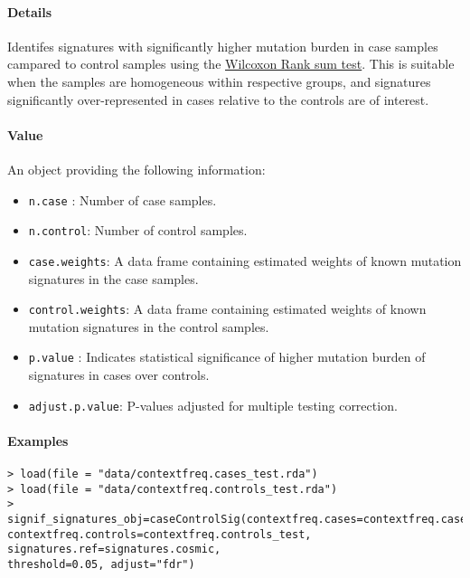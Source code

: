 \documentclass[]{article}
\providecommand{\tightlist}{%
  \setlength{\itemsep}{0pt}\setlength{\parskip}{0pt}}
\let\oldparagraph\paragraph
\renewcommand{\paragraph}[1]{\oldparagraph{#1}\mbox{}}
\begin{document}
\paragraph{\texorpdfstring{\textbf{Details}}{Details}}\label{details-9}

Identifes signatures with significantly higher mutation burden in case
samples campared to control samples using the
\href{https://www.rdocumentation.org/packages/stats/versions/3.5.2/topics/wilcox.test}{Wilcoxon
Rank sum test}. This is suitable when the samples are homogeneous within
respective groups, and signatures significantly over-represented in
cases relative to the controls are of interest.

\paragraph{\texorpdfstring{\textbf{Value}}{Value}}\label{value-11}

An object providing the following information:

\begin{itemize}
\tightlist
\item
  \texttt{n.case} : Number of case samples.
\item
  \texttt{n.control}: Number of control samples.
\item
  \texttt{case.weights}: A data frame containing estimated weights of
  known mutation signatures in the case samples.
\item
  \texttt{control.weights}: A data frame containing estimated weights of
  known mutation signatures in the control samples.
\item
  \texttt{p.value} : Indicates statistical significance of higher
  mutation burden of signatures in cases over controls.
\item
  \texttt{adjust.p.value}: P-values adjusted for multiple testing
  correction.
\end{itemize}

\paragraph{\texorpdfstring{\textbf{Examples}}{Examples}}\label{examples-13}

\begin{verbatim}
> load(file = "data/contextfreq.cases_test.rda")
> load(file = "data/contextfreq.controls_test.rda")
> signif_signatures_obj=caseControlSig(contextfreq.cases=contextfreq.cases_test, 
contextfreq.controls=contextfreq.controls_test, signatures.ref=signatures.cosmic, 
threshold=0.05, adjust="fdr")

\end{verbatim}


\end{document}
